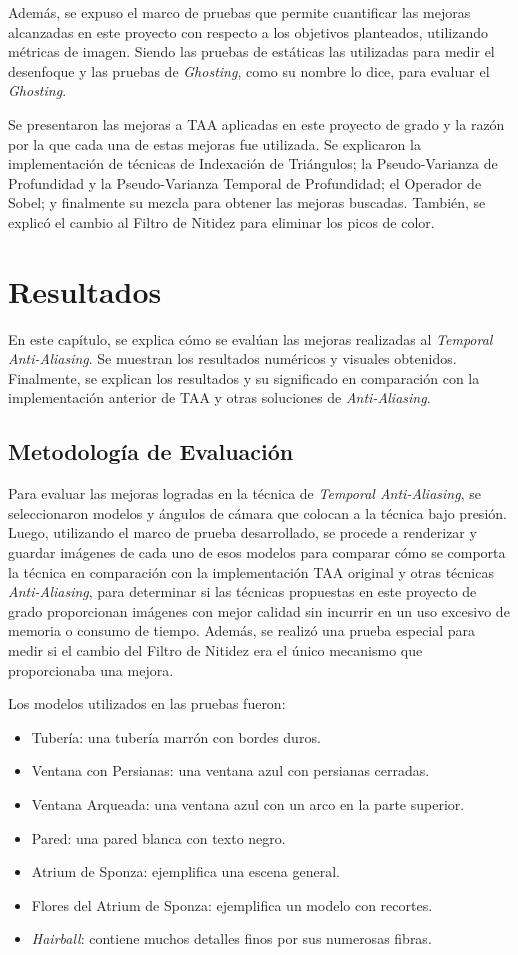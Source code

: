 \documentclass[pregrado]{tesis-usb} %
\begin{document}
Además, se expuso el marco de pruebas que permite cuantificar las mejoras alcanzadas en este proyecto con respecto a los objetivos planteados, utilizando métricas de imagen. Siendo las pruebas de estáticas las utilizadas para medir el desenfoque y las pruebas de \textit{Ghosting}, como su nombre lo dice, para evaluar el \textit{Ghosting}.

Se presentaron las mejoras a TAA aplicadas en este proyecto de grado y la razón por la que cada una de estas mejoras fue utilizada. Se explicaron la implementación de técnicas de Indexación de Triángulos; la Pseudo-Varianza de Profundidad y la Pseudo-Varianza Temporal de Profundidad; el Operador de Sobel; y finalmente su mezcla para obtener las mejoras buscadas. También, se explicó el cambio al Filtro de Nitidez para eliminar los picos de color. 




\chapter{Resultados}
En este capítulo, se explica cómo se evalúan las mejoras realizadas al \textit{Temporal Anti-Aliasing}. Se muestran los resultados numéricos y visuales obtenidos. Finalmente, se explican los resultados y su significado en comparación con la implementación anterior de TAA y otras soluciones de \textit{Anti-Aliasing}.

\section{Metodología de Evaluación}
Para evaluar las mejoras logradas en la técnica de \textit{Temporal Anti-Aliasing}, se seleccionaron modelos y ángulos de cámara que colocan a la técnica bajo presión. Luego, utilizando el marco de prueba desarrollado, se procede a renderizar y guardar imágenes de cada uno de esos modelos para comparar cómo se comporta la técnica en comparación con la implementación TAA original y otras técnicas \textit{Anti-Aliasing}, para determinar si las técnicas propuestas en este proyecto de grado proporcionan imágenes con mejor calidad sin incurrir en un uso excesivo de memoria o consumo de tiempo. Además, se realizó una prueba especial para medir si el cambio del Filtro de Nitidez era el único mecanismo que proporcionaba una mejora.

Los modelos utilizados en las pruebas fueron:
\begin{itemize}
\item Tubería: una tubería marrón con bordes duros.
\item Ventana con Persianas: una ventana azul con persianas cerradas.
\item Ventana Arqueada: una ventana azul con un arco en la parte superior.
\item Pared: una pared blanca con texto negro.
\item Atrium de Sponza: ejemplifica una escena general.
\item Flores del Atrium de Sponza: ejemplifica un modelo con recortes.
\item \textit{Hairball}: contiene muchos detalles finos por sus numerosas fibras.
\end{itemize}
\end{document}
